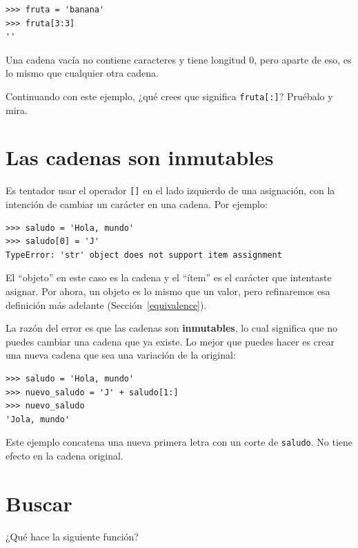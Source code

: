 \documentclass[10pt]{book}
\begin{document}
\begin{verbatim}
>>> fruta = 'banana'
>>> fruta[3:3]
''
\end{verbatim}
%
Una cadena vacía no contiene caracteres y tiene longitud 0, pero aparte
de eso, es lo mismo que cualquier otra cadena.

Continuando con este ejemplo, ¿qué crees que significa
{\tt fruta[:]}?  Pruébalo y mira.



\section{Las cadenas son inmutables}

Es tentador usar el operador {\tt []} en el lado izquierdo de una
asignación, con la intención de cambiar un carácter en una cadena.
Por ejemplo:

\begin{verbatim}
>>> saludo = 'Hola, mundo'
>>> saludo[0] = 'J'
TypeError: 'str' object does not support item assignment
\end{verbatim}
%
El ``objeto'' en este caso es la cadena y el ``ítem'' es
el carácter que intentaste asignar.  Por ahora, un objeto es
lo mismo que un valor, pero refinaremos esa definición
más adelante (Sección~\ref{equivalence}).

La razón del error es que
las cadenas son {\bf inmutables}, lo cual significa que no puedes cambiar una
cadena que ya existe.  Lo mejor que puedes hacer es crear una nueva cadena
que sea una variación de la original:

\begin{verbatim}
>>> saludo = 'Hola, mundo'
>>> nuevo_saludo = 'J' + saludo[1:]
>>> nuevo_saludo
'Jola, mundo'
\end{verbatim}
%
Este ejemplo concatena una nueva primera letra con
un corte de {\tt saludo}.  No tiene efecto en
la cadena original.


\section{Buscar}
\label{find}

¿Qué hace la siguiente función?
\end{document}
